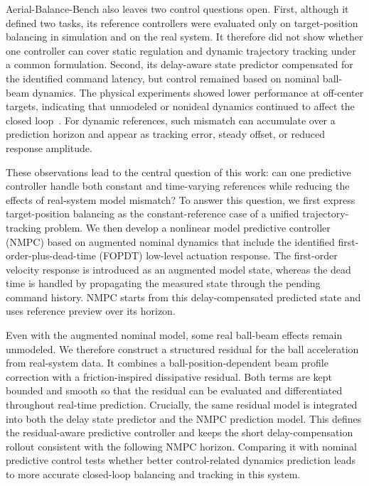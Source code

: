 \documentclass[letterpaper, 10 pt, conference]{ieeeconf}  %
\begin{document}
Aerial-Balance-Bench also leaves two control questions open. First, although it defined two tasks, its
reference controllers were evaluated only on target-position balancing in simulation and on the real system.
It therefore did not show whether one controller can cover static regulation and dynamic trajectory tracking
under a common formulation. Second, its delay-aware state predictor compensated for the identified command
latency, but control remained based on nominal ball-beam dynamics. The physical experiments showed lower
performance at off-center targets, indicating that unmodeled or nonideal dynamics continued to affect the
closed loop~\cite{liu2026aerialBalanceBench}. For dynamic references, such mismatch can accumulate over a
prediction horizon and appear as tracking error, steady offset, or reduced response amplitude.

These observations lead to the central question of this work: can one predictive controller handle both constant
and time-varying references while reducing the effects of real-system model mismatch? To answer this question,
we first express target-position balancing as the constant-reference case of a unified trajectory-tracking problem.
We then develop a nonlinear model predictive controller (NMPC) based on augmented nominal dynamics that include
the identified first-order-plus-dead-time (FOPDT) low-level actuation response. The first-order velocity response
is introduced as an augmented model state, whereas the dead time is handled by propagating the measured state
through the pending command history. NMPC starts from this delay-compensated predicted state and uses reference
preview over its horizon.

Even with the augmented nominal model, some real ball-beam effects remain unmodeled. We therefore construct a
structured residual for the ball acceleration from real-system data. It combines a ball-position-dependent beam
profile correction with a friction-inspired dissipative residual. Both terms are kept bounded and smooth so that
the residual can be evaluated and differentiated throughout real-time prediction. Crucially, the same residual
model is integrated into both the delay state predictor and the NMPC prediction model. This defines the
residual-aware predictive controller and keeps the short delay-compensation rollout consistent with the following
NMPC horizon. Comparing it with nominal predictive control tests whether better control-related dynamics
prediction leads to more accurate closed-loop balancing and tracking in this system.
\end{document}
